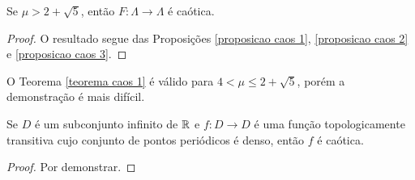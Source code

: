 \begin{theorem}
\label{teorema caos 1}
Se $\mu > 2 + \sqrt{5}$, então $F: \Lambda \to \Lambda$ é caótica.
\end{theorem}

\begin{proof}
O resultado segue das Proposições \ref{proposicao caos 1}, \ref{proposicao caos 2} e \ref{proposicao caos 3}.
\end{proof}

\begin{remark}
O Teorema \ref{teorema caos 1} é válido para $4 < \mu \leq 2 + \sqrt{5}$, porém a demonstração é mais difícil.
\end{remark}

\begin{theorem}
\label{teorema caos 2}
Se $D$ é um subconjunto infinito de $\mathbb{R}$ e $f: D \to D$ é uma função topologicamente transitiva cujo conjunto de pontos periódicos é denso, então $f$ é caótica.
\end{theorem}

\begin{proof}
Por demonstrar.
\end{proof}
